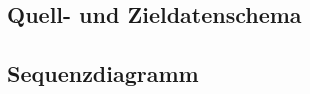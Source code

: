 \documentclass[11pt,toc=sectionentrywithoutdots, 
headheight=44pt, headings=optiontoheadandtoc, hyperfootnotes=false, hypertexnames=false]{scrartcl}
\begin{document}
 
 
 
   
  
 

\subsection{Quell- und Zieldatenschema}
\blindtext\blindtext

\subsection{Sequenzdiagramm}
\blindtext

\end{document}
